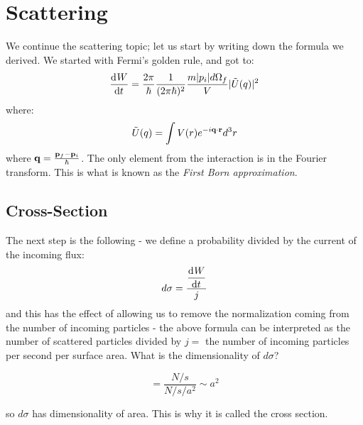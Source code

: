 \section{Scattering}
We continue the scattering topic; let us start by writing down the formula we derived. We started with Fermi's golden rule, and got to:
\begin{equation}
    \dod{W}{t} = \frac{2\pi}{\hbar}\frac{1}{(2\pi\hbar)^2}\frac{m\abs{p_i}d\Omega_f}{V}\abs{\tilde{U}(q)}^2
\end{equation}
where:
\begin{equation}
    \tilde{U}(q) = \int V(r) e^{-i\mathbf{q} \cdot \mathbf{r}}d^3r 
\end{equation}
where $\mathbf{q} = \frac{\mathbf{p}_f - \mathbf{p}_i}{\hbar}$. The only element from the interaction is in the Fourier transform. This is what is known as the \emph{First Born approximation}.

\subsection{Cross-Section}
The next step is the following - we define a probability divided by the current of the incoming flux:
\begin{equation}
    d\sigma = \frac{\dod{W}{t}}{j}
\end{equation}
and this has the effect of allowing us to remove the normalization coming from the number of incoming particles - the above formula can be interpreted as the number of scattered particles divided by $j = $ the number of incoming particles per second per surface area. What is the dimensionality of $d\sigma$?

\begin{equation}
    [d\sigma] = \frac{N/s}{N/s/a^2} \sim a^2
\end{equation}

so $d\sigma$ has dimensionality of area. This is why it is called the cross section.

